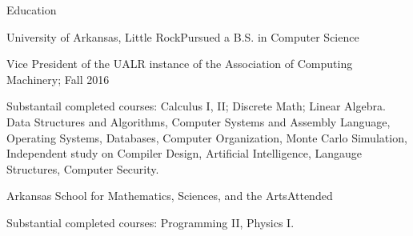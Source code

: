 \documentclass{resume} %
\begin{document}
\clearpage



\begin{rSection}{Education}

\begin{rSubsection}{University of Arkansas, Little Rock}{}{Pursued a B.S. in Computer Science}

	\item Vice President of the UALR instance of the Association of Computing Machinery; Fall 2016
	\item Substantail completed courses: Calculus I, II; Discrete Math; Linear Algebra. Data Structures and Algorithms, Computer Systems and Assembly Language, Operating Systems, Databases, Computer Organization, Monte Carlo Simulation, Independent study on Compiler Design, Artificial Intelligence, Langauge Structures, Computer Security.
\end{rSubsection}

\begin{rSubsection}{Arkansas School for Mathematics, Sciences, and the Arts}{}{Attended}

	\item Substantial completed courses: Programming II, Physics I.
\end{rSubsection}

\end{rSection}
\end{document}
